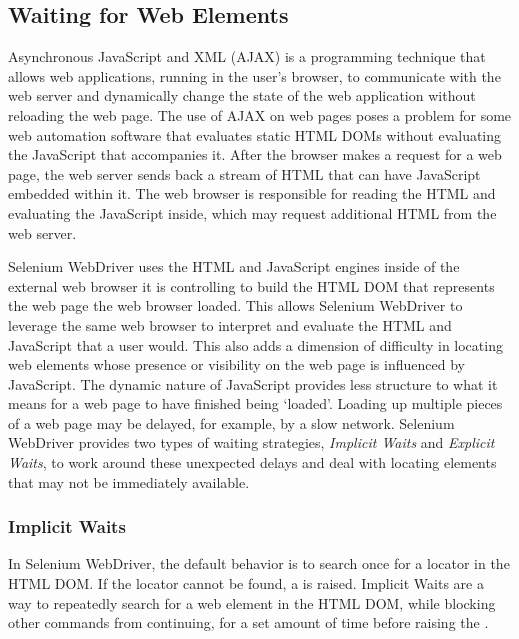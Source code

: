\subsection{Waiting for Web Elements}
\label{ssec:external_libs_selenium_waiting_for_elements}


Asynchronous JavaScript and XML (AJAX) is a programming technique that allows
web applications, running in the user's browser, to communicate with the web
server and dynamically change the state of the web application without
reloading the web page. The use of AJAX on web pages poses a problem for some
web automation software that evaluates static HTML DOMs without evaluating the
JavaScript that accompanies it.  After the browser makes a request for a web
page, the web server sends back a stream of HTML that can have JavaScript
embedded within it. The web browser is responsible for reading the HTML and
evaluating the JavaScript inside, which may request additional HTML from the
web server.

Selenium WebDriver uses the HTML and JavaScript engines inside of the external
web browser it is controlling to build the HTML DOM that represents the web
page the web browser loaded. This allows Selenium WebDriver to leverage the
same web browser to interpret and evaluate the HTML and JavaScript that a user
would.  This also adds a dimension of difficulty in locating web elements whose
presence or visibility on the web page is influenced by JavaScript. The dynamic
nature of JavaScript provides less structure to what it means for a web page to
have finished being `loaded'. Loading up multiple pieces of a web page may be
delayed, for example, by a slow network.  Selenium WebDriver provides two types
of waiting strategies, \textit{Implicit Waits} and \textit{Explicit Waits}, to
work around these unexpected delays and deal with locating elements that may
not be immediately available.

\subsubsection{Implicit Waits}
\label{sssec:external_libs_selenium_implicit_waits}

In Selenium WebDriver, the default behavior is to search once for a locator in
the HTML DOM.  If the locator cannot be found, a
 is raised. Implicit Waits are a way to
repeatedly search for a web element in the HTML DOM, while blocking other
commands from continuing, for a set amount of time before raising the
.

